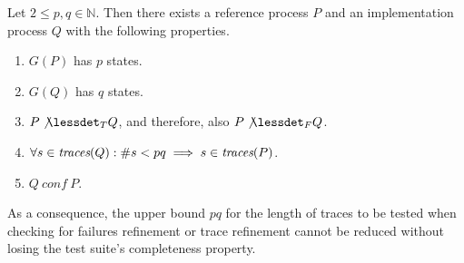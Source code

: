\begin{theorem}\label{th:maxtracelen}
Let $2\le p,q \in\mathbb{N}$. Then there exists a reference process $P$ and an
implementation process $Q$ with the following properties.
\begin{enumerate}
\item $G(P)$ has $p$ states.
\item $G(Q)$ has $q$ states.
\item $P\not\lessdet_T Q$, and therefore, also $P\not\lessdet_F Q$.
\item $\forall s\in\text{\it traces}(Q): \#s < pq\implies s\in\text{\it traces}(P)$.
\item $Q\ conf\ P$.
\end{enumerate}
As a consequence, the upper bound $pq$ for the length of traces to be tested when checking for failures refinement or trace refinement
cannot be reduced without losing the test suite's completeness property.
\end{theorem}
